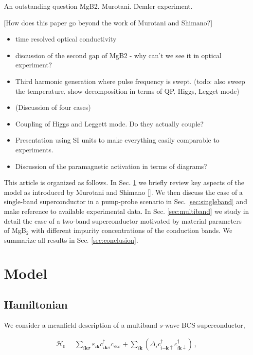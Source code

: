 \documentclass[aps,prb,reprint,noeprint,superscriptaddress]{revtex4-1}
\begin{document}
An outstanding question MgB2. Murotani. Demler experiment.


[How does this paper go beyond the work of Murotani and Shimano?]
\begin{itemize}
  \item time resolved optical conductivity
  \item discussion of the second gap of MgB2 - why can't we see it in
    optical experiment?
  \item Third harmonic generation where pulse frequency is swept. (todo: also
      sweep the temperature, show decomposition in terms of QP, Higgs, Legget
    mode)
  \item (Discussion of four cases)
  \item Coupling of Higgs and Leggett mode. Do they actually couple?
  \item Presentation using SI units to make everything easily comparable to
    experiments.
  \item Discussion of the paramagnetic activation in terms of diagrams?
\end{itemize}

This article is organized as follows. In Sec. \ref{sec:model} we briefly review
key aspects of the model as introduced by Murotani and Shimano []. We then
discuss the case of a single-band superconductor in a pump-probe scenario
in Sec. \ref{sec:singleband} and make reference to available experimental data. 
In Sec. \ref{sec:multiband} we study in detail the case of a two-band
superconductor motivated by material parameters of MgB$_2$ with different 
impurity concentrations of the conduction bands. We summarize all results in
Sec. \ref{sec:conclusion}.







\section{Model}
\label{sec:model}
\subsection{Hamiltonian}
We consider a meanfield description of a multiband $s$-wave BCS superconductor,

\begin{eqnarray}
  \mathcal{H}_{0} = \sum_{i\mathbf{k}\sigma}  
	\varepsilon_{i\mathbf{k}}c_{i\mathbf{k}\sigma}^\dagger
	c_{i\mathbf{k}\sigma} + \sum_{i\mathbf{k}}^{}
	\left( \Delta_i c_{i\mathbf{-k}\uparrow }^\dagger
	c_{i\mathbf{k}\downarrow }^\dagger  \right) \,,
\end{eqnarray}
\end{document}
